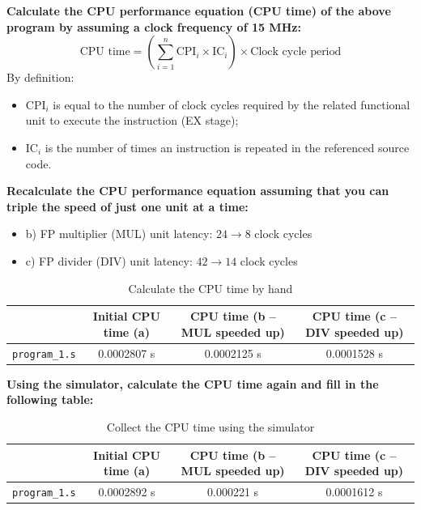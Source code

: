 \documentclass[11pt, a4paper]{article}
\begin{document}
\textbf{Calculate the CPU performance equation (CPU time) of the above program by assuming a clock frequency of 15 MHz:}
\[
\text{CPU time} = \left(\sum_{i=1}^{n} \text{CPI}_i \times \text{IC}_i\right) \times \text{Clock cycle period}
\]
By definition:
\begin{itemize}
    \item $\text{CPI}_i$ is equal to the number of clock cycles required by the related functional unit to execute the instruction (EX stage);
    \item $\text{IC}_i$ is the number of times an instruction is repeated in the referenced source code.
\end{itemize}

\textbf{Recalculate the CPU performance equation assuming that you can triple the speed of just one unit at a time:}
\begin{itemize}
    \item b) FP multiplier (MUL) unit latency: $24 \rightarrow 8$ clock cycles
    \item c) FP divider (DIV) unit latency: $42 \rightarrow 14$ clock cycles
\end{itemize}

\begin{table}[h]
\centering
\caption{Calculate the CPU time by hand}
\label{tab:cpu_time_hand}
\begin{tabular}{|l|c|c|c|}
\hline
& \textbf{Initial CPU time (a)} & \textbf{CPU time (b – MUL speeded up)} & \textbf{CPU time (c – DIV speeded up)} \\ \hline
\texttt{program\_1.s} & 0.0002807 s & 0.0002125 s & 0.0001528 s \\ \hline
\end{tabular}
\end{table}

\textbf{Using the simulator, calculate the CPU time again and fill in the following table:}
\begin{table}[h]
\centering
\caption{Collect the CPU time using the simulator}
\label{tab:cpu_time_sim}
\begin{tabular}{|l|c|c|c|}
\hline
& \textbf{Initial CPU time (a)} & \textbf{CPU time (b – MUL speeded up)} & \textbf{CPU time (c – DIV speeded up)} \\ \hline
\texttt{program\_1.s} & 0.0002892 s & 0.000221 s & 0.0001612 s \\ \hline
\end{tabular}
\end{table}
\end{document}
